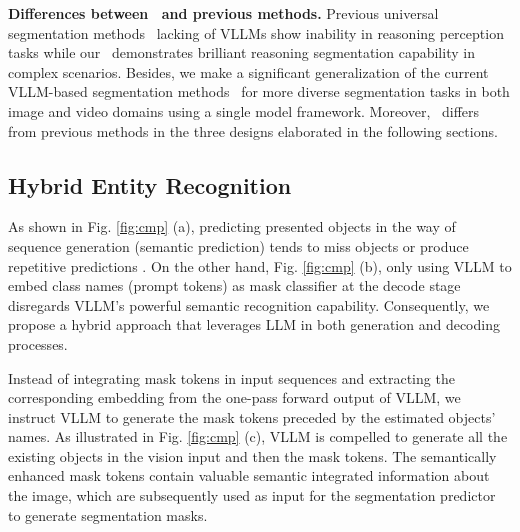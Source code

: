 \noindent \textbf{Differences between \name~and previous methods.}
Previous universal segmentation methods~\cite{lin2023uninext,li2024omg,liu2024universal} lacking of VLLMs show inability in reasoning perception tasks
while our \name~demonstrates brilliant reasoning segmentation capability in complex scenarios.  
Besides, we make a significant generalization of the current VLLM-based segmentation methods~\cite{Lai2023LISARS,zhang2024psalm,yan2024visa,zhang2024omg} for more diverse segmentation tasks in both image and video domains using a single model framework.
Moreover, \name~differs from previous methods in the three designs elaborated in the following sections.

\subsection{Hybrid Entity Recognition}
\label{subsec:her}
As shown in Fig. \ref{fig:cmp} (a), predicting presented objects in the way of sequence generation (semantic prediction) tends to miss objects or produce repetitive predictions \cite{wei2024lasagna}. On the other hand, Fig. \ref{fig:cmp} (b), only using VLLM 
to embed class names (prompt tokens) as mask classifier at the decode stage disregards VLLM's powerful semantic recognition capability.
Consequently, we propose a hybrid approach that leverages LLM in both generation and decoding processes.

Instead of integrating mask tokens in input sequences and extracting the corresponding embedding from the one-pass forward output of VLLM, we instruct VLLM to generate the mask tokens preceded by the estimated objects' names. As illustrated in Fig. \ref{fig:cmp} (c),  VLLM is compelled to generate all the existing objects in the vision input and then the mask tokens. The semantically enhanced mask tokens contain valuable semantic integrated information about the image, which are subsequently used as input for the segmentation predictor to generate segmentation masks.

